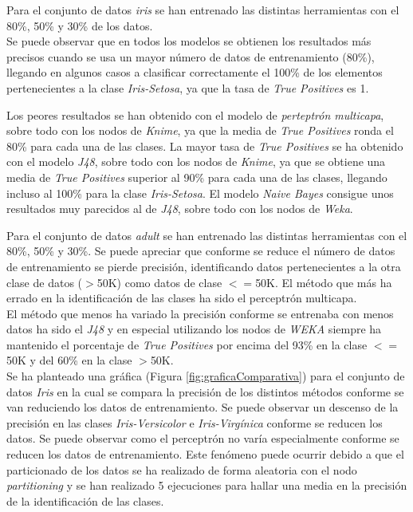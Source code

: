 \documentclass[10pt,a4paper]{article}
\begin{document}
Para el conjunto de datos \emph{iris} se han entrenado las distintas herramientas con el 80\%, 50\% y 30\% de los datos.\\ Se puede observar que en todos los modelos se obtienen los resultados más precisos cuando se usa un mayor número de datos de entrenamiento (80\%), llegando en algunos casos a clasificar correctamente el 100\% de los elementos pertenecientes a la clase \textit{Iris-Setosa}, ya que la tasa de \textit{True Positives} es 1.\par
Los peores resultados se han obtenido con el modelo de \textit{perteptrón multicapa}, sobre todo con los nodos de \textit{Knime}, ya que la media de \textit{True Positives} ronda el 80\% para cada una de las clases.
La mayor tasa de \textit{True Positives} se ha obtenido con el modelo \textit{J48}, sobre todo con los nodos de \textit{Knime}, ya que se obtiene una media de \textit{True Positives} superior al 90\% para cada una de las clases, llegando incluso al 100\% para la clase \textit{Iris-Setosa}. El modelo \textit{Naive Bayes} consigue unos resultados muy parecidos al de \textit{J48}, sobre todo con los nodos de \textit{Weka}.

Para el conjunto de datos \emph{adult} se han entrenado las distintas herramientas con el 80\%, 50\% y 30\%.
Se puede apreciar que conforme se reduce el número de datos de entrenamiento se pierde precisión, identificando datos pertenecientes a la otra clase de datos ($>$50K) como datos de clase $<=$50K. El método que más ha errado en la identificación de las clases ha sido el perceptrón multicapa.\\
El método que menos ha variado la precisión conforme se entrenaba con menos datos ha sido el \emph{J48} y en especial utilizando los nodos de \emph{WEKA} siempre ha mantenido el porcentaje de \emph{True Positives} por encima del 93\% en la clase $<=$50K y del 60\% en la clase $>$50K.\\

Se ha planteado una gráfica (Figura \ref{fig:graficaComparativa}) para el conjunto de datos \emph{Iris} en la cual se compara la precisión de los distintos métodos conforme se van reduciendo los datos de entrenamiento. Se puede observar un descenso de la precisión en las clases \emph{Iris-Versicolor} e \emph{Iris-Virgínica} conforme se reducen los datos. Se puede observar como el perceptrón no varía especialmente conforme se reducen los datos de entrenamiento. Este fenómeno puede ocurrir debido a que el particionado de los datos se ha realizado de forma aleatoria con el nodo \emph{partitioning} y se han realizado 5 ejecuciones para hallar una media en la precisión de la identificación de las clases.\\
\end{document}

